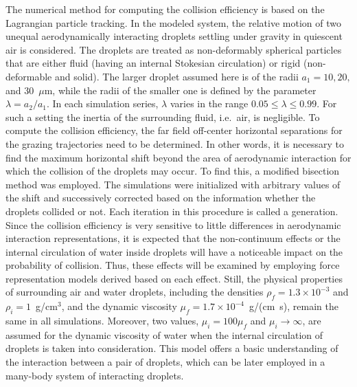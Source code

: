 \documentclass[../thesis.tex]{subfiles}
\begin{document}
The numerical method for computing the collision efficiency is based on the Lagrangian particle tracking. In the modeled system, the relative motion of two unequal aerodynamically interacting droplets settling under gravity in quiescent air is considered. The droplets are treated as non-deformably spherical particles that are either fluid (having an internal Stokesian circulation) or rigid (non-deformable and solid). The larger droplet assumed here is of the radii $a_1=10, 20,$ and 30~$\mu$m, while the radii of the smaller one is defined by the parameter $\lambda= a_2/ a_1$. In each simulation series, $\lambda$ varies in the range $0.05\leq\lambda\leq0.99$. For such a setting the inertia of the surrounding fluid, i.e.\ air, is negligible. To compute the collision efficiency, the far field off-center horizontal separations for the grazing trajectories need to be determined. In other words, it is necessary to find the maximum horizontal shift beyond the area of aerodynamic interaction for which the collision of the droplets may occur. To find this, a modified bisection method was employed. The simulations were initialized with arbitrary values of the shift and successively corrected based on the information whether the droplets collided or not. Each iteration in this procedure is called a generation. Since the collision efficiency is very sensitive to little differences in aerodynamic interaction representations, it is expected that the non-continuum effects or the internal circulation of water inside droplets will have a noticeable impact on the probability of collision. Thus, these effects will be examined by employing force representation models derived based on each effect. Still, the physical properties of surrounding air and water droplets, including the densities $\rho_f = 1.3 \times 10^{-3}$ and $\rho_i=1$~g/cm$^3$, and the dynamic viscosity $\mu_f = 1.7 \times 10^{-4}$~g/(cm~s), remain the same in all simulations. Moreover, two values, $\mu_i = 100\mu_f$ and $\mu_i \to \infty$, are assumed for the dynamic viscosity of water when the internal circulation of droplets is taken into consideration. This model offers a basic understanding of the interaction between a pair of droplets, which can be later employed in a many-body system of interacting droplets.

\end{document}

